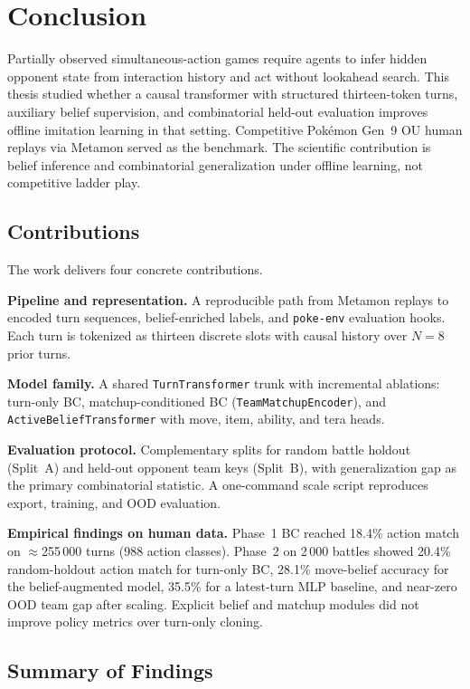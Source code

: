 \chapter{Conclusion}
\label{ch:conclusion}

Partially observed simultaneous-action games require agents to infer hidden
opponent state from interaction history and act without lookahead search. This
thesis studied whether a causal transformer with structured thirteen-token turns,
auxiliary belief supervision, and combinatorial held-out evaluation improves
offline imitation learning in that setting. Competitive Pok\'emon Gen~9 OU human
replays via Metamon served as the benchmark. The scientific contribution is
belief inference and combinatorial generalization under offline learning, not
competitive ladder play.

\section{Contributions}

The work delivers four concrete contributions.

\textbf{Pipeline and representation.} A reproducible path from Metamon replays to
encoded turn sequences, belief-enriched labels, and \texttt{poke-env} evaluation
hooks. Each turn is tokenized as thirteen discrete slots with causal history over
$N=8$ prior turns.

\textbf{Model family.} A shared \texttt{TurnTransformer} trunk with incremental
ablations: turn-only BC, matchup-conditioned BC
(\texttt{TeamMatchupEncoder}), and \texttt{ActiveBeliefTransformer} with move,
item, ability, and tera heads.

\textbf{Evaluation protocol.} Complementary splits for random battle holdout
(Split~A) and held-out opponent team keys (Split~B), with generalization gap as
the primary combinatorial statistic. A one-command scale script reproduces export,
training, and OOD evaluation.

\textbf{Empirical findings on human data.} Phase~1 BC reached 18.4\% action match
on $\approx$255\,000 turns (988 action classes). Phase~2 on 2\,000 battles showed
20.4\% random-holdout action match for turn-only BC, 28.1\% move-belief accuracy
for the belief-augmented model, 35.5\% for a latest-turn MLP baseline, and
near-zero OOD team gap after scaling. Explicit belief and matchup modules did not
improve policy metrics over turn-only cloning.

\section{Summary of Findings}

